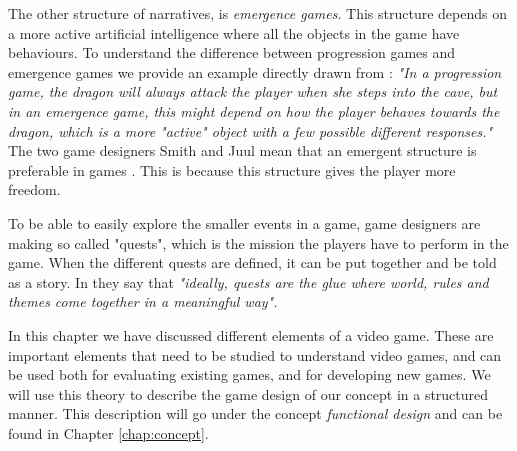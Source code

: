 The other structure of narratives, is \emph{emergence games}. This structure depends on a more active artificial intelligence where all the objects in the game have behaviours. To understand the difference between progression games and emergence games we provide an example directly drawn from \cite{understandingvg}: \emph{"In a progression game, the dragon will always attack the player when she steps into the cave, but in an emergence game, this might depend on how the player behaves towards the dragon, which is a more "active" object with a few possible different responses."} The two game designers Smith and Juul mean that an emergent structure is preferable in games \cite{understandingvg}. This is because this structure gives the player more freedom. 

To be able to easily explore the smaller events in a game, game designers are making so called "quests", which is the mission the players have to perform in the game. When the different quests are defined, it can be put together and be told as a story. In \cite{understandingvg} they say that \emph{"ideally, quests are the glue where world, rules and themes come together in a meaningful way".}

In this chapter we have discussed different elements of a video game. These are important elements that need to be studied to understand video games, and can be used both for evaluating existing games, and for developing new games. We will use this theory to describe the game design of our concept in a structured manner. This description will go under the concept \emph{functional design} and can be found in Chapter \ref{chap:concept}.

